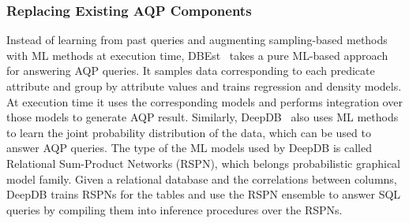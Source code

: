 
\subsubsection{Replacing Existing AQP Components}
Instead of learning from past queries and augmenting sampling-based methods with ML methods at execution time, DBEst~\cite{dbest} takes a pure ML-based approach for answering AQP queries.
It samples data corresponding to each predicate attribute and group by attribute values and trains regression and density models.
At execution time it uses the corresponding models and performs integration over those models to generate AQP result.
Similarly, DeepDB~\cite{deepdb} also uses ML methods to learn the joint probability distribution of the data, which can be used to answer AQP queries.
The type of the ML models used by DeepDB is called Relational Sum-Product Networks (RSPN), which belongs probabilistic graphical model family.
Given a relational database and the correlations between columns, DeepDB trains RSPNs for the tables and use the RSPN ensemble to answer SQL queries by compiling them into inference procedures over the RSPNs.













